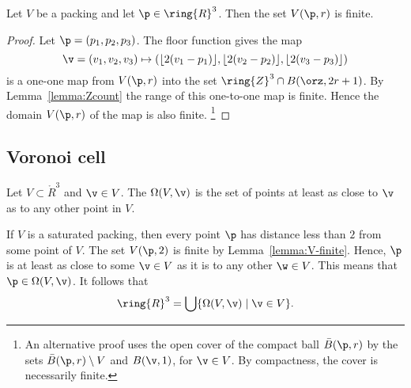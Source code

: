 \begin{lemma}[] 
\label{lemma:V-finite}
Let $ V$ be a packing and let $\p\in\ring{R}^3$.
Then the set $ V(\p,r)$ is finite.
\end{lemma}

\begin{proof}  Let $\p = (p_1,p_2,p_3)$. The floor function gives the map
\begin{displaymath}\v=(v_1,v_2,v_3)\mapsto (\lfloor 2(v_1-p_1)
  \rfloor, \lfloor 2(v_2-p_2) \rfloor, \lfloor 2(v_3-p_3) \rfloor)\end{displaymath}
is a one-one map from $ V(\p,r)$ into the set $\ring{Z}^3\cap B(\orz,2r + 1)$.  
By Lemma~\ref{lemma:Zcount} the range of this one-to-one map is finite. 
Hence the domain $ V(\p,r)$ of the map is also finite.%
\footnote{An alternative proof uses the open cover of the compact ball 
$\bar B(\p,r)$ by the sets $\bar B(\p,r)\setminus V$ and $B(\v,1)$, 
for $\v\in V$. By compactness, the cover is necessarily finite.}
\end{proof}
%






\subsection{Voronoi cell}

\begin{definition}\label{def:voronoi} 
Let $V\subset\ring{R}^3$ and $\v\in V$.
The  
$\Omega(V,\v)$
is the set of points at least as close to $\v$ as to
any other point in $V$. 
\end{definition}

\begin{remark}
  If $V$ is a saturated packing, then every point $\p$ has distance
  less than $2$ from some point of $V$.  The set $V(\p,2)$ is finite
  by Lemma~\ref{lemma:V-finite}.  Hence, $\p$ is at least as close to
  some $\v\in V$ as it is to any other $\w\in V$.  This means that
  $\p\in\Omega(V,\v)$.  It follows that
\begin{equation}\label{eqn:vor-rn} 
\ring{R}^3 = \bigcup \{\Omega(V,\v)\mid \v \in V\}.
\end{equation}
\end{remark}

